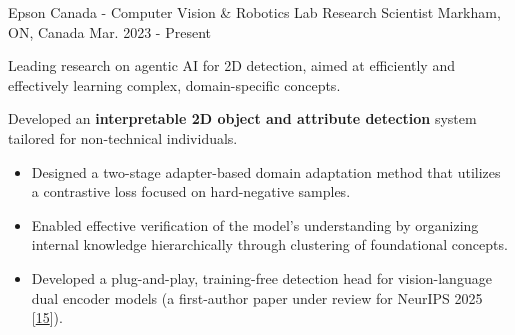 

\vspace*{0.05cm}
\begin{cventries}

\cventry
{Epson Canada - Computer Vision \& Robotics Lab} %
{Research Scientist} %
{Markham, ON, Canada} %
{Mar. 2023 - Present} %
{ %
\begin{cvitems}
\item {Leading research on agentic AI for 2D detection, aimed at efficiently and effectively learning complex, domain-specific concepts.}
\item {Developed an \textbf{interpretable 2D object and attribute detection} system tailored for non-technical individuals.}
\begin{itemize}[label=$\cdot$,leftmargin=0.7em]
\item{Designed a two-stage adapter-based domain adaptation method that utilizes a contrastive loss focused on hard-negative samples.}
\item{Enabled effective verification of the model’s understanding by organizing internal knowledge hierarchically through clustering of foundational concepts.}
\item{Developed a plug-and-play, training-free detection head for vision-language dual encoder models (a first-author paper under review for NeurIPS 2025 [\hyperlink{TIDES:NeurIPS}{15}]).}
\end{itemize}

\end{cvitems}}
\end{cventries}
